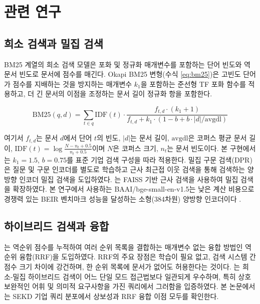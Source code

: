 \documentclass[11pt, a4paper]{article}
\begin{document}
\section{관련 연구}
\label{sec:related}

\subsection{희소 검색과 밀집 검색}

BM25 \citep{robertson2009bm25,robertson1995okapi} 계열의 희소 검색 모델은 포화 및 정규화 매개변수를 포함하는 단어 빈도와 역문서 빈도로 문서에 점수를 매긴다. Okapi BM25 변형(수식 \ref{eq:bm25})은 고빈도 단어가 점수를 지배하는 것을 방지하는 매개변수 $k_1$을 포함하는 준선형 TF 포화 함수를 적용하고, 더 긴 문서의 이점을 조정하는 문서 길이 정규화 항을 포함한다.

\begin{equation}
\text{BM25}(q,d) = \sum_{t \in q} \text{IDF}(t) \cdot \frac{f_{t,d} \cdot (k_1 + 1)}{f_{t,d} + k_1 \cdot (1 - b + b \cdot |d| / \text{avgdl})}
\label{eq:bm25}
\end{equation}

여기서 $f_{t,d}$는 문서 $d$에서 단어 $t$의 빈도, $|d|$는 문서 길이, $\text{avgdl}$은 코퍼스 평균 문서 길이, $\text{IDF}(t) = \log \frac{N - n_t + 0.5}{n_t + 0.5}$이며 $N$은 코퍼스 크기, $n_t$는 문서 빈도이다. 본 구현에서는 $k_1{=}1.5$, $b{=}0.75$를 표준 기업 검색 구성을 따라 적용한다. 밀집 구문 검색(DPR) \citep{karpukhin2020dpr}은 질문 및 구문 인코더를 별도로 학습하고 근사 최근접 이웃 검색을 통해 검색하는 양방향 인코더 밀집 검색을 도입하였다. \citet{xiong2020approximate}는 FAISS 기반 근사 검색을 사용하여 밀집 검색을 확장하였다. 본 연구에서 사용하는 BAAI/bge-small-en-v1.5는 낮은 계산 비용으로 경쟁력 있는 BEIR 벤치마크 성능을 달성하는 소형(384차원) 양방향 인코더이다 \citep{thakur2021beir}.

\subsection{하이브리드 검색과 융합}

\citet{cormack2009rrf}는 역순위 점수를 누적하여 여러 순위 목록을 결합하는 매개변수 없는 융합 방법인 역순위 융합(RRF)을 도입하였다. RRF의 주요 장점은 학습이 필요 없고, 검색 시스템 간 점수 크기 차이에 강건하며, 한 순위 목록에 문서가 없어도 허용한다는 것이다. \citet{luan2021sparse_dense}는 희소-밀집 하이브리드 검색이 어느 단일 모드 접근법보다 일관되게 우수하며, 특히 상호보완적인 어휘 및 의미적 요구사항을 가진 쿼리에서 그러함을 입증하였다. 본 논문에서는 SEKD 기업 쿼리 분포에서 상보성과 RRF 융합 이점 모두를 확인한다.
\end{document}
